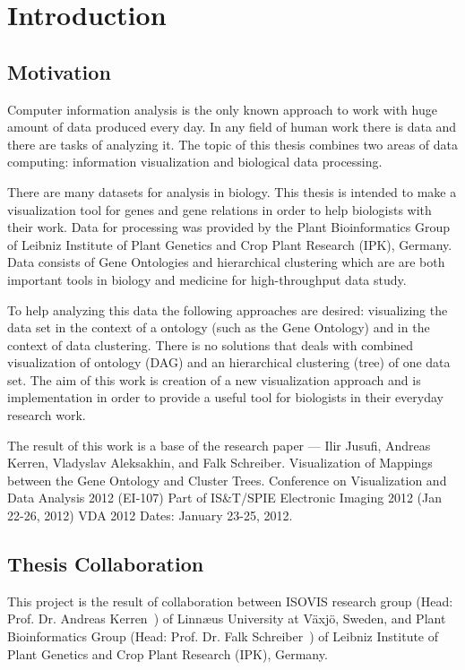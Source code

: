 \section{Introduction}
\label{sec:introduction}

\subsection{Motivation}
\label{sec:motivation}

Computer information analysis is the only known approach to work with huge amount of data produced every day. In any field of human work there is data and there are tasks of analyzing it. The topic of this thesis combines two areas of data computing: information visualization and biological data processing.

There are many datasets for analysis in biology. This thesis is intended to make a visualization tool for genes and gene relations in order to help biologists with their work. Data for processing was provided by the Plant Bioinformatics Group of Leibniz Institute of Plant Genetics and Crop Plant Research (IPK), Germany. Data consists of Gene Ontologies and hierarchical clustering which are are both important tools in biology and medicine for high-throughput data study.

To help analyzing this data the following approaches are desired: visualizing the data set in the context of a ontology (such as the Gene Ontology) and in the context of data clustering. There is no solutions that deals with combined visualization of ontology (DAG) and an hierarchical clustering (tree) of one data set. The aim of this work is creation of a new visualization approach and is implementation in order to provide a useful tool for biologists in their everyday research work.

The result of this work is a base of the research paper --- \textsf{Ilir Jusufi, Andreas Kerren, Vladyslav Aleksakhin, and Falk Schreiber. Visualization of Mappings between the Gene Ontology and Cluster Trees. Conference on Visualization and Data Analysis 2012 (EI-107) Part of IS&T/SPIE Electronic Imaging 2012 (Jan 22-26, 2012) VDA 2012 Dates: January 23-25, 2012.}

\subsection{Thesis Collaboration}
This project is the result of collaboration between ISOVIS research group (Head: Prof. Dr. Andreas Kerren~\cite{Kerren}) of Linn\ae us University at V\"axj\"o, Sweden, and Plant Bioinformatics Group (Head: Prof. Dr. Falk Schreiber~\cite{Schreiber}) of Leibniz Institute of Plant Genetics and Crop Plant Research (IPK), Germany.


